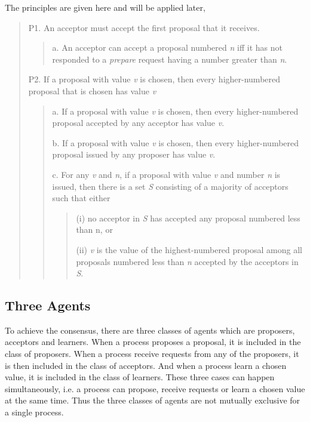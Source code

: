 \documentclass[12pt, a4paper]{article}
\begin{document}
The principles are given here and will be applied later,
\begin{quote}
  P1. An acceptor must accept the first proposal that it receives.
  \begin{quote}
    a. An acceptor can accept a proposal numbered \textit{n} 
      iff it has not responded to a \textit{prepare} request 
      having a number greater than \textit{n}.
  \end{quote}
  P2. If a proposal with value \textit{v} is chosen, 
    then every higher-numbered proposal that is chosen has value \textit{v}
    \begin{quote}
      a. If a proposal with value \textit{v} is chosen, 
        then every higher-numbered proposal accepted 
        by any acceptor has value \textit{v}.
        
      b. If a proposal with value \textit{v} is chosen, 
        then every higher-numbered proposal issued 
        by any proposer has value \textit{v}.

      c. For any \textit{v} and \textit{n}, 
        if a proposal with value \textit{v} 
        and number \textit{n} is issued,
        then there is a set \textit{S} consisting of 
        a majority of acceptors such that either 
          \begin{quote}
            (i) no acceptor in \textit{S} has accepted 
              any proposal numbered less than n, or 
              
            (ii) \textit{v} is the value of 
              the highest-numbered proposal among 
              all proposals numbered less than 
              \textit{n} accepted by the acceptors in \textit{S}.
          \end{quote}
  \end{quote}
\end{quote}

\subsection{Three Agents}

To achieve the consensus, there are three classes of agents 
which are proposers, acceptors and learners. 
When a process proposes a proposal, 
it is included in the class of proposers.
When a process receive requests from any of the proposers,
it is then included in the class of acceptors.
And when a process learn a chosen value, 
it is included in the class of learners.
These three cases can happen simultaneously, i.e.
a process can propose, receive requests or 
learn a chosen value at the same time.
Thus the three classes of agents are 
not mutually exclusive for a single process.
\end{document}
